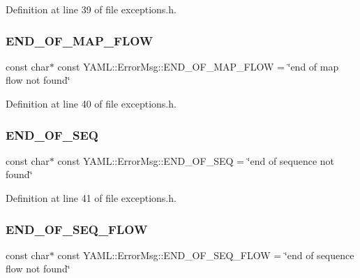 Definition at line 39 of file exceptions.\+h.

\mbox{\label{namespace_y_a_m_l_1_1_error_msg_a296da05ac0955c7c78eaf08501bc0449}} 
\subsubsection{\texorpdfstring{END\_OF\_MAP\_FLOW}{END\_OF\_MAP\_FLOW}}
{\footnotesize\ttfamily const char$\ast$ const Y\+A\+M\+L\+::\+Error\+Msg\+::\+E\+N\+D\+\_\+\+O\+F\+\_\+\+M\+A\+P\+\_\+\+F\+L\+OW = \char`\"{}end of map flow not found\char`\"{}}



Definition at line 40 of file exceptions.\+h.

\mbox{\label{namespace_y_a_m_l_1_1_error_msg_a37dccab6e5fe5d99c00073cf4e540f3b}} 
\subsubsection{\texorpdfstring{END\_OF\_SEQ}{END\_OF\_SEQ}}
{\footnotesize\ttfamily const char$\ast$ const Y\+A\+M\+L\+::\+Error\+Msg\+::\+E\+N\+D\+\_\+\+O\+F\+\_\+\+S\+EQ = \char`\"{}end of sequence not found\char`\"{}}



Definition at line 41 of file exceptions.\+h.

\mbox{\label{namespace_y_a_m_l_1_1_error_msg_ac55b0ba7e0039779d3fcbc8e7f3617c0}} 
\subsubsection{\texorpdfstring{END\_OF\_SEQ\_FLOW}{END\_OF\_SEQ\_FLOW}}
{\footnotesize\ttfamily const char$\ast$ const Y\+A\+M\+L\+::\+Error\+Msg\+::\+E\+N\+D\+\_\+\+O\+F\+\_\+\+S\+E\+Q\+\_\+\+F\+L\+OW = \char`\"{}end of sequence flow not found\char`\"{}}



